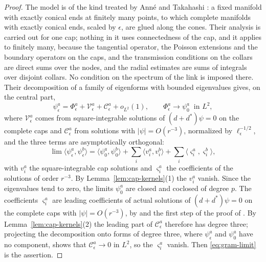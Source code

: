 \begin{proof}
The model is of the kind treated by Ann\'e and Takahashi
\cite{anne-takahashi}: a fixed manifold with exactly conical ends at
finitely many points, to which complete manifolds with exactly conical
ends, scaled by $\epsilon$, are glued along the cones. Their analysis is carried out for one cap; nothing in it uses
connectedness of the cap, and it applies to finitely many, because the
tangential operator, the Poisson extensions and the boundary operators
on the caps, and the transmission conditions on the collars
\cite[Sections~2--4]{anne-takahashi} are direct sums over the nodes, and
the radial estimates are sums of integrals over disjoint collars. No
condition on the spectrum of the link is imposed there. Their
decomposition of a family of eigenforms with bounded eigenvalues
\cite[Corollary~17 and Lemma~18]{anne-takahashi} gives, on the central
part,
\[
 \psi^a_\epsilon=\Phi^a_\epsilon+\mathcal V^a_\epsilon
 +\mathcal C^a_\epsilon+o_{L^2}(1),\qquad
 \Phi^a_\epsilon\longrightarrow\psi^a_0\ \text{ in }L^2 ,
\]
where $\mathcal V^a_\epsilon$ comes from square-integrable solutions of
$(d+d^*)\psi=0$ on the complete caps and $\mathcal C^a_\epsilon$ from
solutions with $|\psi|=O(r^{-3})$, normalized by
$\ell_\epsilon^{-1/2}$, and the three terms are asymptotically
orthogonal:
\begin{equation}\label{eq:gram-limit}
 \lim\langle\psi^a_\epsilon,\psi^b_\epsilon\rangle
 =\langle\psi^a_0,\psi^b_0\rangle+\sum_i\langle v^a_i,v^b_i\rangle
 +\sum_i\langle\varsigma^a_i,\varsigma^b_i\rangle ,
\end{equation}
with $v_i^a$ the square-integrable cap solutions and $\varsigma_i^a$ the
coefficients of the solutions of order $r^{-3}$. By
Lemma~\ref{lem:cap-kernels}(1) the $v^a_i$ vanish. Since the eigenvalues
tend to zero, the limits $\psi^a_0$ are closed and coclosed of degree
$p$. The coefficients $\varsigma^a_i$ are leading coefficients of actual
solutions of $(d+d^*)\psi=0$ on the complete caps with
$|\psi|=O(r^{-3})$, by \cite[Proposition~11]{anne-takahashi} and the first
step of the proof of \cite[Proposition~12]{anne-takahashi}. By
Lemma~\ref{lem:cap-kernels}(2) the leading part of
$\mathcal C^a_\epsilon$ therefore has degree three; projecting the decomposition
onto forms of degree three, where $\psi^a_\epsilon$ and $\psi^a_0$ have
no component, shows that $\mathcal C^a_\epsilon\to0$ in $L^2$, so the
$\varsigma^a_i$ vanish. Then \eqref{eq:gram-limit} is the assertion.
\end{proof}

